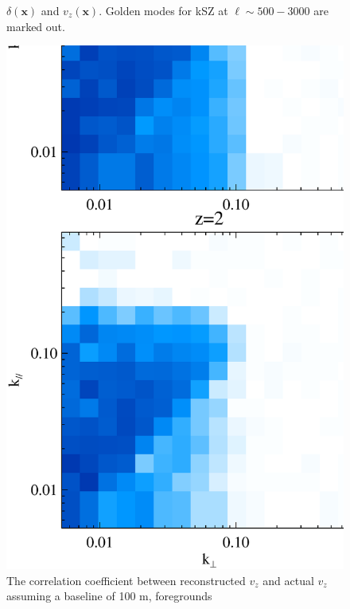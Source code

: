 \begin{figure}[btp]
\begin{minipage}[t]{0.33\linewidth}
{    $\delta(\bm{x})$ and $v_z(\bm{x})$. 
    Golden modes for kSZ at $\ell\sim 500-3000$ are marked out.
}
\label{fig:k3v}
\end{minipage}
\begin{minipage}[t]{0.33\linewidth}
\begin{center}
\includegraphics[width=\textwidth,height=1.7\textwidth]{figure/powv2d_z1z2_r15r10.eps}
\end{center}
\vspace{-0.7cm}
\caption{The correlation coefficient between reconstructed $v_z$  and actual $v_z$ 
assuming a baseline of 100 m, foregrounds 
}
\end{minipage}
\end{figure}
